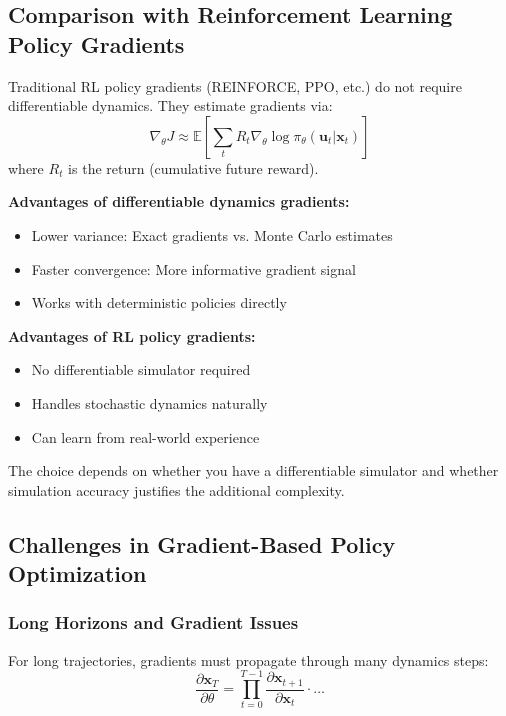 \subsection{Comparison with Reinforcement Learning Policy Gradients}

Traditional RL policy gradients (REINFORCE, PPO, etc.) do not require differentiable dynamics. They estimate gradients via:
\begin{equation}
\nabla_\theta J \approx \mathbb{E}\left[ \sum_t R_t \nabla_\theta \log \pi_\theta(\mathbf{u}_t | \mathbf{x}_t) \right]
\label{eq:reinforce}
\end{equation}
where $R_t$ is the return (cumulative future reward).

\textbf{Advantages of differentiable dynamics gradients:}
\begin{itemize}
    \item Lower variance: Exact gradients vs. Monte Carlo estimates
    \item Faster convergence: More informative gradient signal
    \item Works with deterministic policies directly
\end{itemize}

\textbf{Advantages of RL policy gradients:}
\begin{itemize}
    \item No differentiable simulator required
    \item Handles stochastic dynamics naturally
    \item Can learn from real-world experience
\end{itemize}

The choice depends on whether you have a differentiable simulator and whether simulation accuracy justifies the additional complexity.

\subsection{Challenges in Gradient-Based Policy Optimization}

\subsubsection{Long Horizons and Gradient Issues}

For long trajectories, gradients must propagate through many dynamics steps:
\begin{equation}
\frac{\partial \mathbf{x}_T}{\partial \theta} = \prod_{t=0}^{T-1} \frac{\partial \mathbf{x}_{t+1}}{\partial \mathbf{x}_t} \cdot \ldots
\end{equation}

